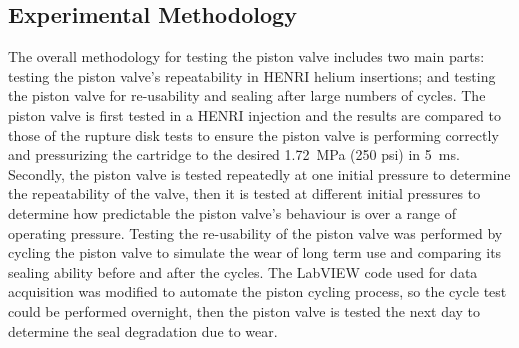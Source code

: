 \subsection{Experimental Methodology} \label{ss:methodology}


The overall methodology for testing the piston valve includes two main parts: testing the piston valve's repeatability in HENRI helium insertions; and testing the piston valve for re-usability and sealing after large numbers of cycles. The piston valve is first tested in a HENRI injection and the results are compared to those of the rupture disk tests to ensure the piston valve is performing correctly and pressurizing the cartridge to the desired \SI{1.72}{\mega\pascal} (250 psi) in \SI{5}{\milli\second}. Secondly, the piston valve is tested repeatedly at one initial pressure to determine the repeatability of the valve, then it is tested at different initial pressures to determine how predictable the piston valve's behaviour is over a range of operating pressure. Testing the re-usability of the piston valve was performed by cycling the piston valve to simulate the wear of long term use and comparing its sealing ability before and after the cycles. The LabVIEW code used for data acquisition was modified to automate the piston cycling process, so the cycle test could be performed overnight, then the piston valve is tested the next day to determine the seal degradation due to wear.